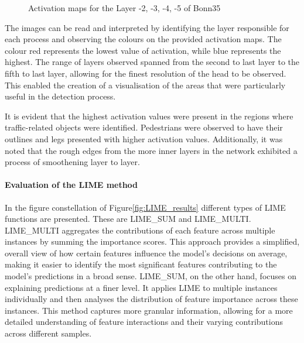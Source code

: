 \begin{figure}[h]
    \caption{Activation maps for the Layer -2, -3, -4, -5 of Bonn35}
    \label{fig:Bonn_000035_000019}
\end{figure}

The images can be read and interpreted by identifying the layer responsible for each process and observing the colours on the provided activation maps.
The colour red represents the lowest value of activation, while blue represents the highest.
The range of layers observed spanned from the second to last layer to the fifth to last layer,
allowing for the finest resolution of the head to be observed.
This enabled the creation of a visualisation of the areas that were particularly useful in the detection process.

It is evident that the highest activation values were present in the regions where traffic-related objects were identified.
Pedestrians were observed to have their outlines and legs presented with higher activation values.
Additionally, it was noted that the rough edges from the more inner layers in the network exhibited a process of smoothening layer to layer.

\paragraph{Evaluation of the LIME method}\label{par:evaluation-of-the-lime-method}
In the figure constellation of Figure\ref{fig:LIME_results} different types of LIME functions are presented. These are LIME\_SUM and LIME\_MULTI.
LIME\_MULTI aggregates the contributions of each feature across multiple instances by summing the importance scores.
This approach provides a simplified, overall view of how certain features influence the model's decisions on average,
making it easier to identify the most significant features contributing to the model's predictions in a broad sense.
LIME\_SUM, on the other hand, focuses on explaining predictions at a finer level.
It applies LIME to multiple instances individually and then analyses the distribution of feature importance across these instances.
This method captures more granular information, allowing for a more detailed understanding of feature interactions and their varying contributions across different samples.

